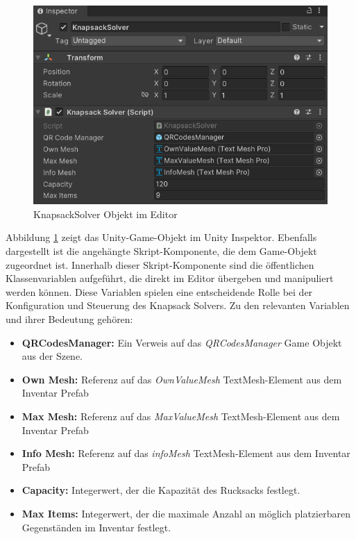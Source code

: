 \begin{figure}[H]
    \centering
    \includegraphics[scale=0.7]{images/knapsackEditor}
    \caption{KnapsackSolver Objekt im Editor}
    \label{fig:Knapsack_Editor}
\end{figure}

Abbildung \ref{fig:Knapsack_Editor} zeigt das Unity-Game-Objekt im Unity Inspektor. Ebenfalls dargestellt ist die angehängte
Skript-Komponente, die dem Game-Objekt zugeordnet ist. Innerhalb dieser Skript-Komponente sind die öffentlichen Klassenvariablen
aufgeführt, die direkt im Editor übergeben und manipuliert werden können. Diese Variablen spielen eine entscheidende Rolle
bei der Konfiguration und Steuerung des Knapsack Solvers. Zu den relevanten Variablen und ihrer Bedeutung gehören:
\begin{itemize}
    \item \textbf{QRCodesManager:} Ein Verweis auf das \textit{QRCodesManager} Game Objekt aus der Szene.

    \item \textbf{Own Mesh:} Referenz auf das \textit{OwnValueMesh} TextMesh-Element aus dem Inventar Prefab

    \item \textbf{Max Mesh:} Referenz auf das \textit{MaxValueMesh} TextMesh-Element aus dem Inventar Prefab

    \item \textbf{Info Mesh:} Referenz auf das \textit{infoMesh} TextMesh-Element aus dem Inventar Prefab

    \item \textbf{Capacity:} Integerwert, der die Kapazität des Rucksacks festlegt.

    \item \textbf{Max Items:} Integerwert, der die maximale Anzahl an möglich platzierbaren Gegenständen im Inventar
    festlegt.
\end{itemize}

